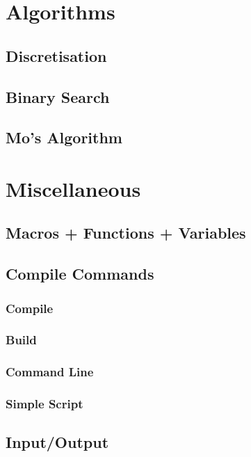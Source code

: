 \documentclass{article}
\begin{document}
\section{Algorithms}
\subsection{Discretisation}

\subsection{Binary Search}

\subsection{Mo's Algorithm}


\section{Miscellaneous}
\subsection{Macros + Functions + Variables}


\subsection{Compile Commands}
\subsubsection{Compile}

\subsubsection{Build}

\subsubsection{Command Line}

\subsubsection{Simple Script}


\subsection{Input/Output}
\end{document}
